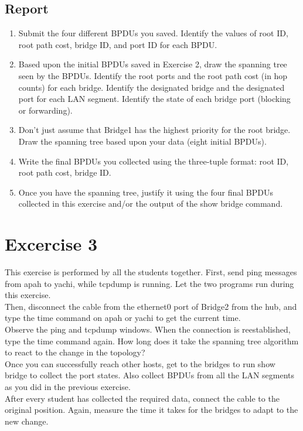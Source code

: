 \documentclass[10pt,a4paper]{article}
\numberwithin{equation}{section}
\numberwithin{figure}{section}
\numberwithin{table}{section}
\begin{document}
    \subsection*{Report}
    \begin{enumerate}
        \item Submit the four different BPDUs you saved. Identify the values of root ID, root path cost, bridge ID, and port ID for each BPDU. 
	    \item Based upon the initial BPDUs saved in Exercise 2, draw the spanning tree seen by the BPDUs. Identify the root ports and the root path cost (in hop counts) for each bridge. Identify the designated bridge and the designated port for each LAN segment. Identify the state of each bridge port (blocking or forwarding). 
        \item Don’t just assume that Bridge1 has the highest priority for the root bridge. Draw the spanning tree based upon your data (eight initial BPDUs). 
        \item Write the final BPDUs you collected using the three-tuple format: {root ID, root path cost, bridge ID}. 
        \item Once you have the spanning tree, justify it using the four final BPDUs collected in this exercise and/or the output of the show bridge command. 
    \end{enumerate}

\section*{Excercise 3}
  This exercise is performed by all the students together. First, send ping messages from apah to yachi, while tcpdump is running. Let the two programs run during this exercise. \\
Then, disconnect the cable from the ethernet0 port of Bridge2 from the hub, and type the time command on apah or yachi to get the current time. \\
Observe the ping and tcpdump windows. When the connection is reestablished, type the time command again. How long does it take the spanning tree algorithm to react to the change in the topology? \\
Once you can successfully reach other hosts, get to the bridges to run show bridge to collect the port states. Also collect BPDUs from all the LAN segments as you did in the previous exercise. \\
After every student has collected the required data, connect the cable to the original position. Again, measure the time it takes for the bridges to adapt to the new change. 
\end{document}
